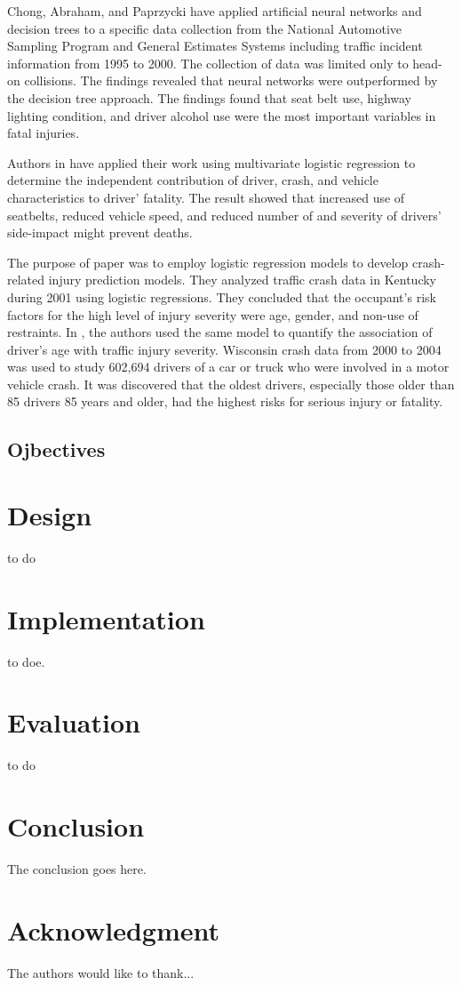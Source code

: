 \documentclass[conference]{IEEEtran}
\begin{document}
Chong, Abraham, and Paprzycki \cite{chong2004traffic} have applied artificial neural networks and decision trees to a specific data collection from the National Automotive Sampling Program and General Estimates Systems including traffic incident information from 1995 to 2000. The collection of data was limited only to head-on collisions. The findings revealed that neural networks were outperformed by the decision tree approach. The findings found that seat belt use, highway lighting condition, and driver alcohol use were the most important variables in fatal injuries.

Authors in \cite{Bedard} have applied their work using multivariate logistic regression to determine the independent contribution of driver, crash, and vehicle characteristics to driver' fatality. The result showed that increased use of seatbelts, reduced vehicle speed, and reduced number of and severity of drivers' side-impact might prevent deaths.

The purpose of paper \cite{SingletonFactors} was to employ logistic regression models to develop crash-related injury prediction models. They analyzed traffic crash data in Kentucky during 2001 using logistic regressions. They concluded that the occupant’s risk factors for the high level of injury severity were age, gender, and non-use of restraints. In \cite{ associationHanrahan}, the authors used the same model to quantify the association of driver’s age with traffic injury severity. Wisconsin crash data from 2000 to 2004 was used to study 602,694 drivers of a car or truck who were involved in a motor vehicle crash. It was discovered that the oldest drivers, especially those older than 85 drivers 85 years and older, had the highest risks for serious injury or fatality.

\subsection{Ojbectives}



\section{Design}
to do

\section{Implementation}
to doe.

\section{Evaluation}
to do
\section{Conclusion}
The conclusion goes here.
 





\section*{Acknowledgment}
The authors would like to thank...



{\small}
 
\end{document}
